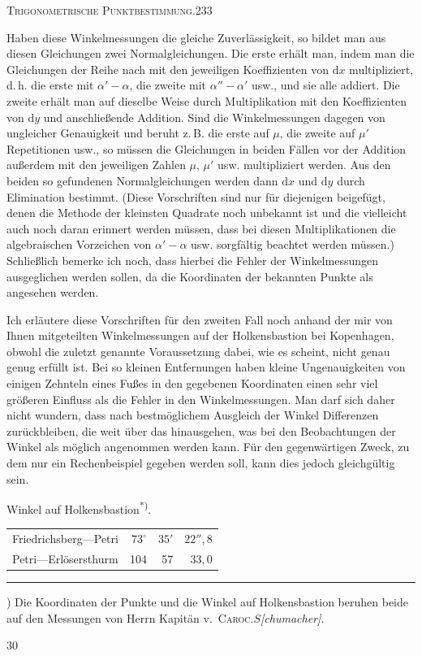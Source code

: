 \clearpage
\noindent\mbox{}\hfill\textsc{Trigonometrische Punktbestimmung.}\hfill233\par\medskip
Haben diese Winkelmessungen die gleiche Zuverlässigkeit, so bildet man aus diesen Gleichungen zwei Normalgleichungen. Die erste erhält man, indem man die Gleichungen der Reihe nach mit den jeweiligen Koeffizienten von $\mathrm dx$ multipliziert, d.\,h. die erste mit $\alpha'-\alpha$, die zweite mit $\alpha''-\alpha'$ usw., und sie alle addiert. Die zweite erhält man auf dieselbe Weise durch Multiplikation mit den Koeffizienten von $\mathrm dy$ und anschließende Addition. Sind die Winkelmessungen dagegen von ungleicher Genauigkeit und beruht z.\,B. die erste auf $\mu$, die zweite auf $\mu'$ Repetitionen usw., so müssen die Gleichungen in beiden Fällen vor der Addition außerdem mit den jeweiligen Zahlen $\mu$, $\mu'$ usw. multipliziert werden. Aus den beiden so gefundenen Normalgleichungen werden dann $\mathrm dx$ und $\mathrm dy$ durch Elimination bestimmt. (Diese Vorschriften sind nur für diejenigen beigefügt, denen die Methode der kleinsten Quadrate noch unbekannt ist und die vielleicht auch noch daran erinnert werden müssen, dass bei diesen Multiplikationen die algebraischen Vorzeichen von $\alpha'-\alpha$ usw. sorgfältig beachtet werden müssen.) Schließlich bemerke ich noch, dass hierbei  die Fehler der Winkelmessungen ausgeglichen werden sollen, da die Koordinaten der bekannten Punkte als  angesehen werden.

Ich erläutere diese Vorschriften für den zweiten Fall noch anhand der mir von Ihnen mitgeteilten Winkelmessungen auf der Holkensbastion bei Kopenhagen, obwohl die zuletzt genannte Voraussetzung dabei, wie es scheint, nicht genau genug erfüllt ist. Bei so kleinen Entfernungen haben kleine Ungenauigkeiten von einigen Zehnteln eines Fußes in den gegebenen Koordinaten einen sehr viel größeren Einfluss als die Fehler in den Winkelmessungen. Man darf sich daher nicht wundern, dass nach bestmöglichem Ausgleich der Winkel Differenzen zurückbleiben, die weit über das hinausgehen, was bei den Beobachtungen der Winkel als möglich angenommen werden kann. Für den gegenwärtigen Zweck, zu dem nur ein Rechenbeispiel gegeben werden soll, kann dies jedoch gleichgültig sein.
\begin{center}
Winkel auf Holkensbastion\textsuperscript{*)}.
\end{center}
\begin{center}
\begin{tabular}{lrrr}
Friedrichsberg---Petri&$73^\circ$&$35'$&$22''{,}8$\\
Petri---Erlösersthurm&104&57&$33{,}0$
\end{tabular}
\end{center}
\vfill
\noindent\rule{4cm}{.4pt}\par
{\footnotesize *) Die Koordinaten der Punkte und die Winkel auf Holkensbastion beruhen beide auf den Messungen von Herrn Kapitän v.~\textsc{Caroc}.\quad $S$\textit{[chumacher].}\par}
\medskip{}\hfill30\hspace*{2cm}

